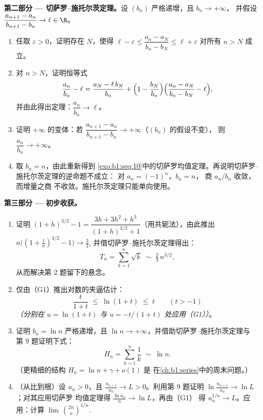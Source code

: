 \begin{problem}[{周末问题 --- 切萨罗--施托尔茨定理，
以及 $u_n \sim \sqrt{3/n}$ 的渐近性，对于 $u_{n+1} = \sin
u_n$}]
\medskip
\noindent\textbf{第二部分 --- 切萨罗--施托尔茨定理。}设
        $(b_n)$ 严格递增，且 $b_n \to +\infty$，
        并假设 $\dfrac{a_{n+1} - a_n}{b_{n+1} - b_n} \to \ell \in \R$。
\begin{enumerate}[resume]
  \item 任取 $\varepsilon > 0$，证明存在 $N$，使得
        $\ell - \varepsilon \leq \dfrac{a_n - a_N}{b_n - b_N}
        \leq \ell + \varepsilon$ 对所有 $n > N$ 成立。
  \item 对 $n > N$，证明恒等式
        \[
        \frac{a_n}{b_n} - \ell
        = \frac{a_N - \ell\,b_N}{b_n}
        + \Bigl(1 - \frac{b_N}{b_n}\Bigr)
        \Bigl(\frac{a_n - a_N}{b_n - b_N} - \ell\Bigr),
        \]
        并由此得出定理：$\dfrac{a_n}{b_n} \to \ell$。
  \item 证明 $+\infty$ 的变体：若 $\dfrac{a_{n+1} -
        a_n}{b_{n+1} - b_n} \to +\infty$（$(b_n)$ 的假设不变），
        则 $\dfrac{a_n}{b_n} \to +\infty$。
  \item 取 $b_n = n$，由此重新得到
        \cref{exo:b1:seq:10}中的切萨罗均值定理。再说明切萨罗--施托尔茨定理的逆命题不成立：
        对 $a_n = (-1)^n$，$b_n = n$，
        商 $a_n/b_n$ 收敛，而增量之商
        不收敛。施托尔茨定理只能单向使用。
\end{enumerate}

\medskip
\noindent\textbf{第三部分 --- 初步收获。}
\begin{enumerate}[resume]
  \item 证明 $(1+h)^{3/2} - 1 = \dfrac{3h + 3h^2 +
        h^3}{(1+h)^{3/2} + 1}$（用共轭法），由此推出
        $n\bigl((1 + \tfrac1n)^{3/2} - 1\bigr) \to \tfrac32$,
        并借切萨罗--施托尔茨定理得出：
        \[
        T_n = \sum_{k=1}^{n} \sqrt k \;\sim\; \tfrac23\,
        n^{3/2} ,
        \]
        从而解决第 2 题留下的悬念。
  \item 仅由（G1）推出对数的夹逼估计：
        \[
        \frac{t}{1 + t} \;\leq\; \ln(1 + t) \;\leq\; t
        \qquad (t > -1)
        \]
        \emph{（分别在 $u = \ln(1+t)$ 与 $u =
        -t/(1+t)$ 处应用（G1））}。
  \item 证明 $b_n = \ln n$ 严格递增，且
        $\ln n \to +\infty$，并借助切萨罗--施托尔茨定理与
        第 9 题证明下式：
        \[
        H_n = \sum_{k=1}^{n} \frac 1k \;\sim\; \ln n .
        \]
        （更精细的结构 $H_n = \ln n + \gamma + o(1)$ 是
        在\cref{ch:b1:series}中的周末问题。）
  \item （从比到根）设 $u_n > 0$，且
        $\frac{u_{n+1}}{u_n} \to L > 0$。利用第 9 题证明
        $\ln\frac{u_{n+1}}{u_n} \to \ln L$；对其应用切萨罗
        均值定理得 $\frac{\ln u_n}{n} \to \ln L$，再由（G1）
        得 $u_n^{1/n} \to L$。应用：计算
        $\lim\,\binom{2n}{n}^{1/n}$.
\end{enumerate}


\end{problem}
